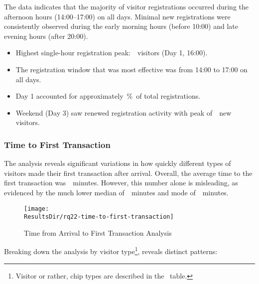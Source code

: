 The data indicates that the majority of visitor registrations occurred during the afternoon hours (14:00–17:00) on all days.
Minimal new registrations were consistently observed during the early morning hours (before 10:00) and late evening hours (after 20:00).

\begin{keytakeaways}
	\begin{itemize}
		\item Highest single-hour registration peak:~~visitors (Day 1, 16:00).
		\item The registration window that was most effective was from 14:00 to 17:00 on all days.
		\item Day 1 accounted for approximately~\%~of total registrations.
		\item Weekend (Day 3) saw renewed registration activity with peak of~~new visitors.
	\end{itemize}
\end{keytakeaways}


\subsubsection{Time to First Transaction}
\label{subsubsec:analysis-first-transaction}

\begin{rqbox}
	\textit{}
\end{rqbox}

The analysis reveals significant variations in how quickly different types of visitors made their first transaction after arrival.
Overall, the average time to the first transaction was~~minutes.
However, this number alone is misleading, as evidenced by the much lower median of~~minutes and mode of~~minutes.

\begin{figure}[H]
	\centering
	\texttt{[image: \\ResultsDir/rq22-time-to-first-transaction]}
	\caption{Time from Arrival to First Transaction Analysis}
	\label{fig:time-to-first-transaction}
	\source
\end{figure}

Breaking down the analysis by visitor type\footnote{Visitor or rather, chip types are described in the~ table.}, reveals distinct patterns:

